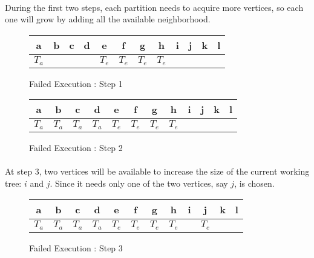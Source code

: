 \paragraph{}
During the first two steps, each partition needs to acquire more vertices, so
each one will grow by adding all the available neighborhood.

\begin{figure}[H]
  \caption{Failed Execution : Step 1}
  \begin{center}
    \begin{tikzpicture}[scale=0.9,transform shape]
      
    \end{tikzpicture}
    \begin{tabular}{|c|c|c|c|c|c|c|c|c|c|c|c|}
\hline
a & b & c & d & e & f & g & h & i & j & k & l\\
\hline
$T_a$ & & & & $T_e$ & $T_e$ & $T_e$ & $T_e$ & & & &\\
\hline
    \end{tabular}
  \end{center}
\end{figure}

\begin{figure}[H]
  \caption{Failed Execution : Step 2}
  \begin{center}
    \begin{tikzpicture}[scale=0.9,transform shape]
      
    \end{tikzpicture}
    \begin{tabular}{|c|c|c|c|c|c|c|c|c|c|c|c|}
\hline
a & b & c & d & e & f & g & h & i & j & k & l\\
\hline
$T_a$ & $T_a$ & $T_a$ & $T_a$ & $T_e$ & $T_e$ & $T_e$ & $T_e$ & & & &\\
\hline
    \end{tabular}
  \end{center}
\end{figure}

\paragraph{}
At step 3, two vertices will be available to increase the size of the current
working tree: $i$ and $j$. Since it needs only one of the two vertices, say
$j$,  is chosen.

\begin{figure}[H]
  \caption{Failed Execution : Step 3}
  \begin{center}
    \begin{tikzpicture}[scale=0.9,transform shape]
      
    \end{tikzpicture}
    \begin{tabular}{|c|c|c|c|c|c|c|c|c|c|c|c|}
\hline
a & b & c & d & e & f & g & h & i & j & k & l\\
\hline
$T_a$ & $T_a$ & $T_a$ & $T_a$ & $T_e$ & $T_e$ & $T_e$ & $T_e$ & & $T_e$ & &\\
\hline
    \end{tabular}
  \end{center}
\end{figure}

